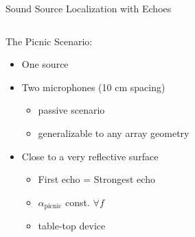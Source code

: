 \begin{frame}[t]{Sound Source Localization \alert{with Echoes} \hfill\faMapMarked*}

    \vspace*{2mm}
    \begin{columns}[T,onlytextwidth]

        \begin{column}{0.5\textwidth}
            \begin{block}{The \alert{Picnic} Scenario:}
                \begin{itemize}
                    \small
                    \item<1-> One source
                    \item<1-> Two microphones (10 cm spacing)
                    \begin{itemize}
                        \item<1->[$\rightarrow$] passive scenario
                        \item<1->[$\rightarrow$] generalizable to any array geometry
                    \end{itemize}
                    \item<2-> Close to a very reflective surface
                    \begin{itemize}
                        \item<2->[$\rightarrow$] First echo = Strongest echo
                        \item<2->[$\rightarrow$] $\alpha_\text{picnic}$ const. $\forall f$
                        \item<2->[$\rightarrow$] table-top device
                    \end{itemize}
                \end{itemize}
            \end{block}
        \end{column}


\end{columns}
\end{frame}
